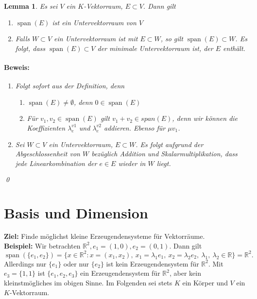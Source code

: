 \documentclass{report}
\newcommand{\lb}{\lambda}
\newcommand{\R}{\mathbb{R}}
\DeclareMathOperator{\Span}{span}
\theoremstyle{customrem}
\theoremstyle{customdef}
\newtheorem{lemma}[definition]{Lemma}
\renewenvironment{proof}{\paragraph{Beweis: }}{\qed}
\theoremstyle{customenv}
\begin{document}
	\begin{lemma}
		Es sei \(V\) ein \(K\)-Vektorraum, \(E \subset V\). Dann gilt
		\begin{enumerate}
			\item \(\Span(E)\) ist ein Untervektorraum von \(V\)
			\item Falls \(W \subset V\) ein Untervektorraum ist mit \(E \subset W\), so gilt \(\Span(E) \subset W\). Es folgt, dass \(\Span(E) \subset V\) der minimale Untervektorraum ist, der \(E\) enthält.
		\end{enumerate}
		
		\begin{proof}
			\begin{enumerate}
				\item Folgt sofort aus der Definition, denn 
				\begin{enumerate}
					\item \(\Span(E) \neq \emptyset\), denn \(0 \in \Span(E)\)
					\item Für \(v_1, v_2 \in \Span(E)\) gilt \(v_1 + v_2 \in span(E)\), denn wir können die Koeffizienten \(\lb_e^{v1}\) und \(\lb_e^{v2}\) addieren. Ebenso für \(\mu v_1\).
				\end{enumerate}
				\item Sei \(W \subset V\) ein Untervektorraum, \(E \subset W\). Es folgt aufgrund der Abgeschlossenheit von \(W\) bezüglich Addition und Skalarmultiplikation, dass jede Linearkombination der \(e \in E\) wieder in \(W\) liegt.
			\end{enumerate}
		\end{proof}
	\end{lemma}
	
\section{Basis und Dimension}
	\textbf{Ziel:} Finde möglichst kleine Erzeugendensysteme für Vektorräume.\\
	\textbf{Beispiel:} Wir betrachten \(\R^2, e_1=(1, 0), e_2 = (0,1)\). Dann gilt
	 \[
	 \Span(\{e_1, e_2\}) = \{x \in \R^2 : x = (x_1, x_2),\ x_1 = \lb_1 e_1,\ x_2 = \lb_2 e_2,\ \lb_1,\ \lb_2 \in \R\} = \R^2.
	 \] 
	Allerdings nur \(\{e_1\}\) oder nur \(\{e_2\}\) ist kein Erzeugendensystem für \(\R^2\). Mit \(e_3 = \{1, 1\}\) ist \(\{e_1, e_2, e_3\}\) ein Erzeugendensystem für \(\R^2\), aber kein kleinstmögliches im obigen Sinne.
	Im Folgenden sei stets \(K\) ein Körper und \(V\) ein \(K\)-Vektorraum.
	
\end{document}
